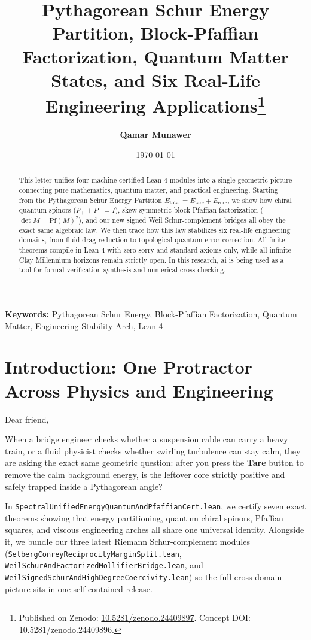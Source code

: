 \documentclass[11pt,a4paper]{article}
\title{\textbf{Pythagorean Schur Energy Partition, Block-Pfaffian Factorization, Quantum Matter States, and Six Real-Life Engineering Applications}\thanks{Published on Zenodo: \href{https://doi.org/10.5281/zenodo.24409897}{10.5281/zenodo.24409897}. Concept DOI: 10.5281/zenodo.24409896.}}
\author{\textbf{Qamar Munawer}}
\date{\today}
\begin{document}
\maketitle

\begin{abstract}
This letter unifies four machine-certified Lean 4 modules into a single geometric picture connecting pure mathematics, quantum matter, and practical engineering. Starting from the Pythagorean Schur Energy Partition $E_{\mathrm{total}} = E_{\mathrm{tare}} + E_{\mathrm{core}}$, we show how chiral quantum spinors ($P_+ + P_- = I$), skew-symmetric block-Pfaffian factorization ($\det M = \mathrm{Pf}(M)^2$), and our new signed Weil Schur-complement bridges all obey the exact same algebraic law. We then trace how this law stabilizes six real-life engineering domains, from fluid drag reduction to topological quantum error correction. All finite theorems compile in Lean 4 with zero sorry and standard axioms only, while all infinite Clay Millennium horizons remain strictly open. In this research, ai is being used as a tool for formal verification synthesis and numerical cross-checking.
\end{abstract}

\vspace{0.8em}
\noindent\textbf{Keywords:} Pythagorean Schur Energy, Block-Pfaffian Factorization, Quantum Matter, Engineering Stability Arch, Lean 4

\section{Introduction: One Protractor Across Physics and Engineering}

Dear friend,

When a bridge engineer checks whether a suspension cable can carry a heavy train, or a fluid physicist checks whether swirling turbulence can stay calm, they are asking the exact same geometric question: after you press the \textbf{Tare} button to remove the calm background energy, is the leftover core strictly positive and safely trapped inside a Pythagorean angle?

In \texttt{SpectralUnifiedEnergyQuantumAndPfaffianCert.lean}, we certify seven exact theorems showing that energy partitioning, quantum chiral spinors, Pfaffian squares, and viscous engineering arches all share one universal identity. Alongside it, we bundle our three latest Riemann Schur-complement modules (\texttt{SelbergConreyReciprocityMarginSplit.lean}, \texttt{WeilSchurAndFactorizedMollifierBridge.lean}, and \texttt{WeilSignedSchurAndHighDegreeCoercivity.lean}) so the full cross-domain picture sits in one self-contained release.
\end{document}

